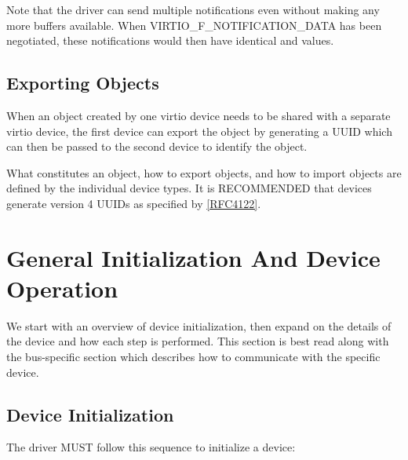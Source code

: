 Note that the driver can send multiple notifications even without
making any more buffers available. When VIRTIO_F_NOTIFICATION_DATA
has been negotiated, these notifications would then have
identical  and  values.



\section{Exporting Objects}\label{sec:Basic Facilities of a Virtio Device / Exporting Objects}

When an object created by one virtio device needs to be
shared with a separate virtio device, the first device can
export the object by generating a UUID which can then
be passed to the second device to identify the object.

What constitutes an object, how to export objects, and
how to import objects are defined by the individual device
types. It is RECOMMENDED that devices generate version 4
UUIDs as specified by \hyperref[intro:rfc4122]{[RFC4122]}.




\chapter{General Initialization And Device Operation}\label{sec:General Initialization And Device Operation}

We start with an overview of device initialization, then expand on the
details of the device and how each step is performed.  This section
is best read along with the bus-specific section which describes
how to communicate with the specific device.

\section{Device Initialization}\label{sec:General Initialization And Device Operation / Device Initialization}

The driver MUST follow this sequence to initialize a device:

